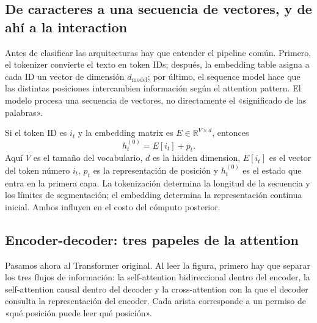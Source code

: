 \subsection{De caracteres a una secuencia de vectores, y de ahí a la interaction}

Antes de clasificar las arquitecturas hay que entender el pipeline común. Primero, el tokenizer convierte el texto en token IDs; después, la embedding table asigna a cada ID un vector de dimensión $d_{\text{model}}$; por último, el sequence model hace que las distintas posiciones intercambien información según el attention pattern. El modelo procesa una secuencia de vectores, no directamente el «significado de las palabras».



Si el token ID es $i_t$ y la embedding matrix es $E\in\mathbb{R}^{V\times d}$, entonces
\[
h_t^{(0)}=E[i_t]+p_t.
\]
Aquí $V$ es el tamaño del vocabulario, $d$ es la hidden dimension, $E[i_t]$ es el vector del token número $i_t$, $p_t$ es la representación de posición y $h_t^{(0)}$ es el estado que entra en la primera capa. La tokenización determina la longitud de la secuencia y los límites de segmentación; el embedding determina la representación continua inicial. Ambos influyen en el costo del cómputo posterior.


\subsection{Encoder-decoder: tres papeles de la attention}

Pasamos ahora al Transformer original. Al leer la figura, primero hay que separar los tres flujos de información: la self-attention bidireccional dentro del encoder, la self-attention causal dentro del decoder y la cross-attention con la que el decoder consulta la representación del encoder. Cada arista corresponde a un permiso de «qué posición puede leer qué posición».

